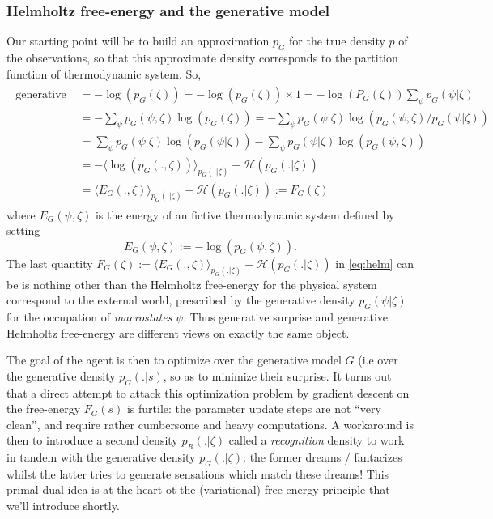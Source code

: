 \documentclass{article} %
\begin{document}
\subsubsection{Helmholtz free-energy and the generative model}
Our starting point will be to build an approximation $p_G$ for the true density $p$ of the observations, so that this approximate density corresponds to the partition function of thermodynamic system. So,
\begin{eqnarray}
  \begin{split}
    \text{generative surprise } &= -\log(p_G(\zeta)) = -\log(p_G(\zeta)) \times 1 = -\log(P_G(\zeta))\sum_{\psi}p_G(\psi |\zeta)\\
    &= -\sum_{\psi}p_G(\psi, \zeta)\log(p_G(\zeta))
    =-\sum_{\psi}p_G(\psi |\zeta)\log(p_G(\psi, \zeta)/p_G(\psi|\zeta))\\
    &= \sum_{\psi}p_G(\psi |\zeta)\log(p_G(\psi|\zeta))-\sum_{\psi}p_G(\psi |\zeta)\log  (p_G(\psi, \zeta))\\
    &= -\langle \log  (p_G(., \zeta)) \rangle_{p_G(. |\zeta)} - \mathcal H(p_G(. |\zeta))\\
    &= \langle E_G(., \zeta) \rangle_{p_G(. |\zeta)} - \mathcal H(p_G(. |\zeta)) := F_G(\zeta)
  \end{split}
  \label{eq:helm}
\end{eqnarray}
where $E_G(\psi, \zeta)$ is the energy of an fictive thermodynamic system defined by setting
\begin{equation}
  E_G(\psi, \zeta) := -\log(p_G(\psi, \zeta)).
  \label{eq:gibbs}
\end{equation}
The last quantity $F_G(\zeta) := \langle E_G(., \zeta) \rangle_{p_G(. |\zeta)} - \mathcal H(p_G(. |\zeta))$ in \eqref{eq:helm} can be is nothing other than the Helmholtz free-energy for the physical system correspond to the external world, prescribed by the generative density $p_G(\psi|\zeta)$ for the occupation of \textit{macrostates} $\psi$. Thus generative surprise and generative Helmholtz free-energy are different views on exactly the same object.

The goal of the agent is then to optimize over the generative model $G$ (i.e over the generative density $p_G(.|s)$, so as to minimize their surprise. It turns out that a direct attempt to attack this optimization problem by gradient descent on the free-energy $F_G(s)$ is furtile: the parameter update steps are not ``very clean'', and require rather cumbersome and heavy computations. A workaround is then to introduce a second density $p_R(.|\zeta)$ called a \textit{recognition} density to work in tandem with the generative density $p_G(.|\zeta)$: the former dreams / fantacizes whilst the latter tries to generate sensations which match these dreams! This primal-dual idea is at the heart ot the (variational) free-energy principle that we'll introduce shortly.
\end{document}
